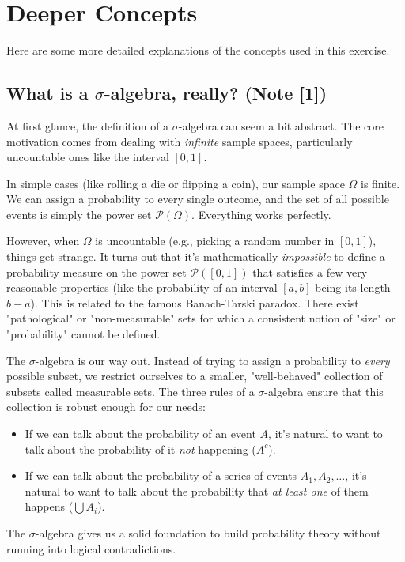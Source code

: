 \documentclass[11pt,a4paper]{article}
\begin{document}
\newpage
\section{Deeper Concepts}
Here are some more detailed explanations of the concepts used in this exercise.

\hypertarget{note1}{}%
\subsection{What is a \texorpdfstring{$\sigma$}{sigma}-algebra, really? (Note [1])}
At first glance, the definition of a $\sigma$-algebra can seem a bit abstract. The core motivation comes from dealing with \textit{infinite} sample spaces, particularly uncountable ones like the interval $[0,1]$.

In simple cases (like rolling a die or flipping a coin), our sample space $\Omega$ is finite. We can assign a probability to every single outcome, and the set of all possible events is simply the power set $\mathcal{P}(\Omega)$. Everything works perfectly.

However, when $\Omega$ is uncountable (e.g., picking a random number in $[0,1]$), things get strange. It turns out that it's mathematically \textit{impossible} to define a probability measure on the power set $\mathcal{P}([0,1])$ that satisfies a few very reasonable properties (like the probability of an interval $[a,b]$ being its length $b-a$). This is related to the famous Banach-Tarski paradox. There exist "pathological" or "non-measurable" sets for which a consistent notion of "size" or "probability" cannot be defined.

The $\sigma$-algebra is our way out. Instead of trying to assign a probability to \textit{every} possible subset, we restrict ourselves to a smaller, "well-behaved" collection of subsets called measurable sets. The three rules of a $\sigma$-algebra ensure that this collection is robust enough for our needs:
\begin{itemize}
    \item If we can talk about the probability of an event $A$, it's natural to want to talk about the probability of it \textit{not} happening ($A^c$).
    \item If we can talk about the probability of a series of events $A_1, A_2, \ldots$, it's natural to want to talk about the probability that \textit{at least one} of them happens ($\bigcup A_i$).
\end{itemize}
The $\sigma$-algebra gives us a solid foundation to build probability theory without running into logical contradictions.
\end{document}

